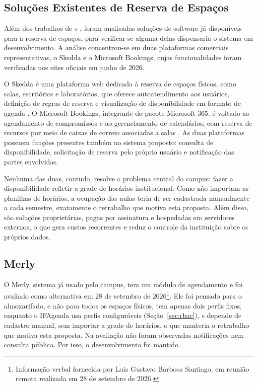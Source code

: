 \subsection{Soluções Existentes de Reserva de Espaços}
\label{sec:relsoftwares}

Além dos trabalhos de  e , foram analisadas soluções de software já disponíveis para a reserva de espaços, para verificar se alguma delas dispensaria o sistema em desenvolvimento. A análise concentrou-se em duas plataformas comerciais representativas, o Skedda e o Microsoft Bookings, cujas funcionalidades foram verificadas nos sites oficiais em junho de 2026.

O Skedda é uma plataforma web dedicada à reserva de espaços físicos, como salas, escritórios e laboratórios, que oferece autoatendimento aos usuários, definição de regras de reserva e visualização de disponibilidade em formato de agenda \cite{skedda2025}. O Microsoft Bookings, integrante do pacote Microsoft 365, é voltado ao agendamento de compromissos e ao gerenciamento de calendários, com reserva de recursos por meio de caixas de correio associadas a salas \cite{microsoft2025bookings}. As duas plataformas possuem funções presentes também no sistema proposto: consulta de disponibilidade, solicitação de reserva pelo próprio usuário e notificação das partes envolvidas.

Nenhuma das duas, contudo, resolve o problema central do campus: fazer a disponibilidade refletir a grade de horários institucional. Como não importam as planilhas de horários, a ocupação das aulas teria de ser cadastrada manualmente a cada semestre, exatamente o retrabalho que motiva esta proposta. Além disso, são soluções proprietárias, pagas por assinatura e hospedadas em servidores externos, o que gera custos recorrentes e reduz o controle da instituição sobre os próprios dados.

\subsection{Merly}
\label{sec:relmerly}

O Merly, sistema já usado pelo campus, tem um módulo de agendamento e foi avaliado como alternativa em 28 de setembro de 2026\footnote{Informação verbal fornecida por Luis Gustavo Barbosa Santiago, em reunião remota realizada em 28 de setembro de 2026.}. Ele foi pensado para o almoxarifado, e não para todos os espaços físicos, tem apenas dois perfis fixos, enquanto o IFAgenda usa perfis configuráveis (Seção~\ref{sec:rbac}), e depende de cadastro manual, sem importar a grade de horários, o que manteria o retrabalho que motiva esta proposta. Na avaliação não foram observadas notificações nem consulta pública. Por isso, o desenvolvimento foi mantido.

